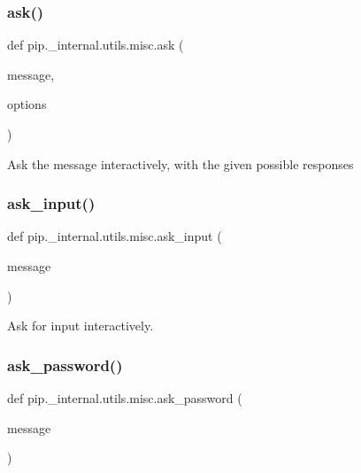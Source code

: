 \subsubsection{\texorpdfstring{ask()}{ask()}}
{\footnotesize\ttfamily def pip.\+\_\+internal.\+utils.\+misc.\+ask (\begin{DoxyParamCaption}\item[{}]{message,  }\item[{}]{options }\end{DoxyParamCaption})}

\begin{DoxyVerb}Ask the message interactively, with the given possible responses\end{DoxyVerb}
 \mbox{\label{namespacepip_1_1__internal_1_1utils_1_1misc_a9ec01c897364c3352bdf608fb36f1f66}} 
\subsubsection{\texorpdfstring{ask\+\_\+input()}{ask\_input()}}
{\footnotesize\ttfamily def pip.\+\_\+internal.\+utils.\+misc.\+ask\+\_\+input (\begin{DoxyParamCaption}\item[{}]{message }\end{DoxyParamCaption})}

\begin{DoxyVerb}Ask for input interactively.\end{DoxyVerb}
 \mbox{\label{namespacepip_1_1__internal_1_1utils_1_1misc_a8e1a385d363d4b5fdc42370dfd017a5d}} 
\subsubsection{\texorpdfstring{ask\+\_\+password()}{ask\_password()}}
{\footnotesize\ttfamily def pip.\+\_\+internal.\+utils.\+misc.\+ask\+\_\+password (\begin{DoxyParamCaption}\item[{}]{message }\end{DoxyParamCaption})}


